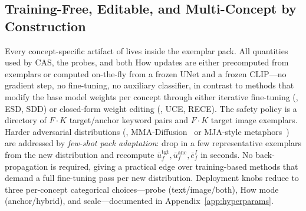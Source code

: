 \subsection{Training-Free, Editable, and Multi-Concept by Construction}
\label{subsec:training_free}

Every concept-specific artifact of \ours{} lives inside the exemplar pack. All quantities used by CAS, the probes, and both How updates are either precomputed from exemplars or computed on-the-fly from a frozen UNet and a frozen CLIP---no gradient step, no fine-tuning, no auxiliary classifier, in contrast to methods that modify the base model weights per concept through either iterative fine-tuning (\eg, ESD, SDD) or closed-form weight editing (\eg, UCE, RECE). The safety policy is a directory of $F{\cdot}K$ target/anchor keyword pairs and $F{\cdot}K$ target image exemplars. Harder adversarial distributions (\eg, MMA-Diffusion~\citep{yang2024mma} or MJA-style metaphors~\citep{zhang2026reason2attack}) are addressed by \emph{few-shot pack adaptation}: drop in a few representative exemplars from the new distribution and recompute $\bar{u}^{\text{tgt}}_f, \bar{u}^{\text{anc}}_f, \bar{e}^{I}_f$ in seconds. No back-propagation is required, giving a practical edge over training-based methods that demand a full fine-tuning pass per new distribution. Deployment knobs reduce to three per-concept categorical choices---probe (text/image/both), How mode (anchor/hybrid), and scale---documented in Appendix~\ref{app:hyperparams}.

